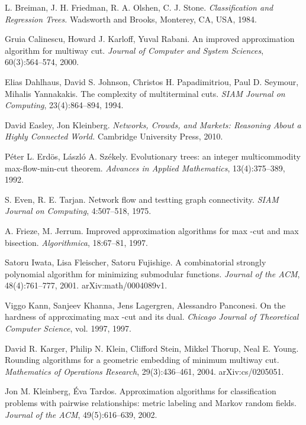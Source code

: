 \documentclass[11pt]{article}
\begin{document}
\begin{thebibliography}{99}

L. Breiman, J. H. Friedman, R. A. Olshen, C. J. Stone.
{\em Classification and Regression Trees.}
Wadsworth and Brooks, Monterey, CA, USA, 1984.

Gruia Calinescu, Howard J. Karloff, Yuval Rabani.
An improved approximation algorithm for multiway cut.
{\em Journal of Computer and System Sciences},
60(3):564--574, 2000.

Elias Dahlhaus, David S. Johnson, Christos H. Papadimitriou, Paul D. Seymour,
Mihalis Yannakakis.
The complexity of multiterminal cuts.
{\em SIAM Journal on Computing},
23(4):864--894, 1994.

David Easley, Jon Kleinberg.
{\em Networks, Crowds, and Markets: Reasoning About a Highly Connected World.}
Cambridge University Press, 2010.

P\'eter L. Erd\"os, L\'aszl\'o A. Sz\'ekely.
Evolutionary trees: an integer multicommodity max-flow-min-cut theorem.
{\em Advances in Applied Mathematics},
13(4):375--389, 1992.

S. Even, R. E. Tarjan.
Network flow and testting graph connectivity.
{\em SIAM Journal on Computing},
4:507--518, 1975.

A. Frieze, M. Jerrum.
Improved approximation algorithms for max -cut and max bisection.
{\em Algorithmica}, 18:67--81, 1997.

Satoru Iwata, Lisa Fleischer, Satoru Fujishige.
A combinatorial strongly polynomial algorithm for minimizing submodular functions.
{\em Journal of the ACM}, 48(4):761--777, 2001.
arXiv:math/0004089v1.

Viggo Kann, Sanjeev Khanna, Jens Lagergren, Alessandro Panconesi.
On the hardness of approximating max -cut and its dual.
{\em Chicago Journal of Theoretical Computer Science}, vol. 1997, 1997.

David R. Karger, Philip N. Klein, Clifford Stein, Mikkel Thorup, Neal E. Young.
Rounding algorithms for a geometric embedding of minimum multiway cut.
{\em Mathematics of Operations Research},
29(3):436--461, 2004.
arXiv:cs/0205051.

Jon M. Kleinberg, \'Eva Tardos.
Approximation algorithms for classification problems with pairwise relationships:
metric labeling and Markov random fields.
{\em Journal of the ACM},
49(5):616--639, 2002.


\end{thebibliography}
\end{document}
